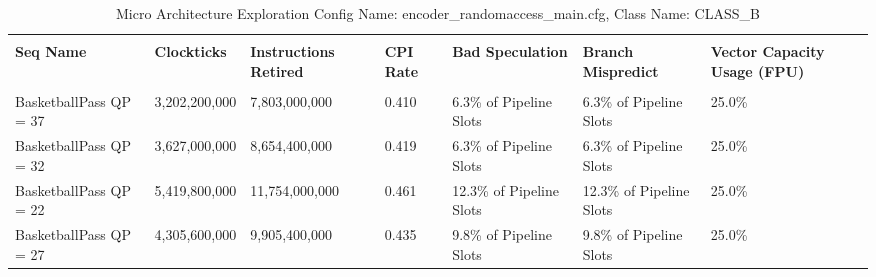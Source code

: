 \documentclass{article}%
\begin{document}
\newpage%
\begin{longtabu}{| X[l] | X[l] | X[l] | X[l] | X[l] | X[l] | X[l] |}%
\caption{%
Micro Architecture Exploration\newline%
 Config Name: encoder\_randomaccess\_main.cfg,\newline%
 Class Name: CLASS\_B\newline%
%
}%
\hline%
&&&&&&\\%
\textbf{Seq Name}&\textbf{Clockticks}&\textbf{Instructions Retired}&\textbf{CPI Rate}&\textbf{Bad Speculation}&\textbf{Branch Mispredict}&\textbf{Vector Capacity Usage (FPU)}\\%
&&&&&&\\%
\hline%
\endhead%
BasketballPass\newline%
 QP = 37&3,202,200,000&7,803,000,000&0.410&6.3\% of Pipeline Slots&6.3\% of Pipeline Slots&25.0\%\\%
\hline%
BasketballPass\newline%
 QP = 32&3,627,000,000&8,654,400,000&0.419&6.3\% of Pipeline Slots&6.3\% of Pipeline Slots&25.0\%\\%
\hline%
BasketballPass\newline%
 QP = 22&5,419,800,000&11,754,000,000&0.461&12.3\% of Pipeline Slots&12.3\% of Pipeline Slots&25.0\%\\%
\hline%
BasketballPass\newline%
 QP = 27&4,305,600,000&9,905,400,000&0.435&9.8\% of Pipeline Slots&9.8\% of Pipeline Slots&25.0\%\\%
\hline%
\end{longtabu}%
\end{document}
